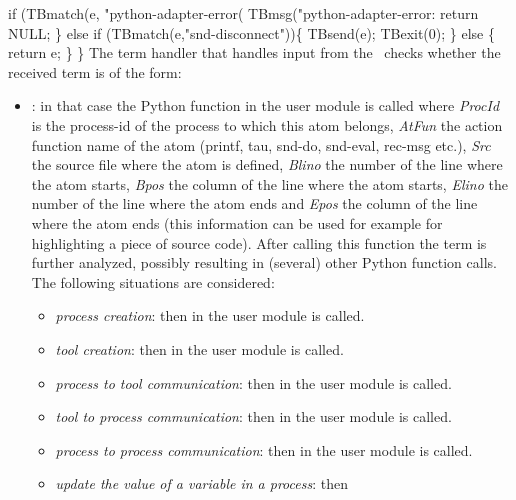   if (TBmatch(e, "python-adapter-error(%
    TBmsg("python-adapter-error: %
    return NULL;
  \} else if (TBmatch(e,"snd-disconnect"))\{
    TBsend(e);
    TBexit(0);
  \} else \{
    return e;
  \}
\}
\nwendcode{}\nwdocspar
The term handler that handles input from the \TB\ checks whether the
received term is of the form:
\begin{itemize}
\item {}: in that case the Python
  function 
  in the user module is called where \emph{ProcId} is the process-id
  of the process to which this atom belongs, \emph{AtFun} the action
  function name of the atom (printf, tau, snd-do, snd-eval, rec-msg
  etc.), \emph{Src} the source file where the atom is defined,
  \emph{Blino} the number of the line where the atom starts,
  \emph{Bpos} the column of the line where the atom starts,
  \emph{Elino} the number of the line where the atom ends and
  \emph{Epos} the column of the line where the atom ends (this
  information can be used for example for highlighting a piece of
  source code). After calling this function the term is further
  analyzed, possibly resulting in (several) other Python function
  calls. The following situations are considered:
  \begin{itemize}
  \item \emph{process creation}: then  in the user module is called.
  \item \emph{tool creation}: then  in the user module is called.
  \item \emph{process to tool communication}: then 
     in the
    user module is called.
  \item \emph{tool to process communication}: then 
     in the
    user module is called.
  \item \emph{process to process communication}: then 
     in the
    user module is called.
  \item \emph{update the value of a variable in a process}: then 

\end{itemize}
\end{itemize}
